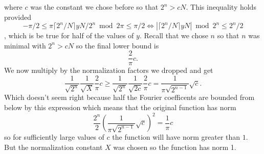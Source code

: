 \documentclass[10pt]{article}
\theoremstyle{plain}
\theoremstyle{definition}
\begin{document}
where \( c \) was the constant we chose before so that \( 2^n > cN \).
This inequality holds provided 
\[
-\pi / 2 \leq  \pi \lceil 2^n / N \rceil yN / 2^{n} \bmod{2\pi}   \leq \pi / 2 \Leftrightarrow \left| \lceil 2^n / N \rceil yN\right| \bmod{2^n} \leq 2^n/2
\]
, which is be true for half of the values of \( y \).
Recall that we chose \( n \) so that \( n \) was minimal with \( 2^n > cN \) so the final lower bound is
\[
    \frac{2}{\pi}c.
\]
We now multiply by the normalization factors we dropped and get
\[
    \frac{1}{\sqrt{2^n}}\frac{1}{\sqrt{X}}\frac{2}{\pi}c 
    \geq \frac{1}{\sqrt{2^n}}\frac{1}{\sqrt{2c}}\frac{2}{\pi}c 
    =\frac{1}{\pi\sqrt{2^{n-1}}}\sqrt{c}.
\]
Which doesn't seem right because half the Fourier coefficents are bounded from below by this expression which means that the original function has norm
\[
	\frac{2^n}{2}\left(\frac{1}{\pi\sqrt{2^{n-1}}}\sqrt{c} \right)^2
	=\frac{1}{\pi}c
\]
so for sufficiently large values of \( c \) the function will have norm greater than \( 1 \).
But the normalization constant \( X \) was chosen so the function has norm 1.
\end{document}
